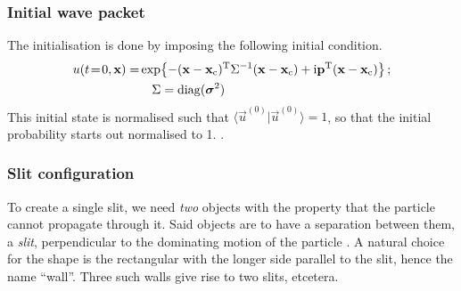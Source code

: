     \subsubsection{Initial wave packet}\label{sec:method:initial_wave}
    The initialisation is done by imposing the following initial condition. 
    \begin{equation}\label{eq:p4_initial_condition}
    \begin{split}
        u(t\!=\!0, \mathbf{x}) = & \exp{-(\mathbf{x}-\mathbf{x}_\mathrm{c})^\mathrm{T}\Sigma^{-1}(\mathbf{x}-\mathbf{x}_\mathrm{c}) + \mathrm{i}\mathbf{p}^\mathrm{T}(\mathbf{x}-\mathbf{x}_\mathrm{c})} \,;  \\ 
        &\quad\Sigma = \mathrm{diag}(\boldsymbol{\sigma}^2)  
    \end{split}
    \end{equation}
    This initial state is normalised such that $\langle \vec{u}^{(0)} | \vec{u}^{(0)}\rangle = 1$, so that the initial probability starts out normalised to 1. .
 


    \subsubsection{Slit configuration}\label{sec:method:slit_config}
        To create a single slit, we need \textit{two} objects with the property that the particle cannot propagate through it. Said objects are to have a separation between them, a \textit{slit}, perpendicular to the dominating motion of the particle . A natural choice for the shape is the rectangular with the longer side parallel to the slit,  hence the name ``wall''. Three such walls give rise to two slits, etcetera.

